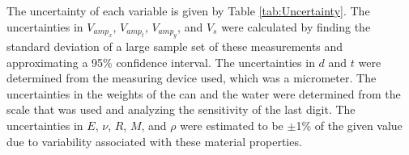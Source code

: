 \documentclass[10pt,journal,letterpaper]{IEEEtran}
\begin{document}
The uncertainty of each variable is given by Table \ref{tab:Uncertainty}.
The uncertainties in $V_{amp_{x}}$, $V_{amp_{t}}$, $V_{amp_{y}}$, and $V_{s}$ were calculated by finding the standard deviation of a large sample set of these measurements and approximating a 95\% confidence interval.
The uncertainties in $d$ and $t$ were determined from the measuring device used, which was a micrometer.
The uncertainties in the weights of the can and the water were determined from the scale that was used and analyzing the sensitivity of the last digit.
The uncertainties in $E$, $\nu$, $R$, $M$, and $\rho$ were estimated to be $\pm$1\% of the given value due to variability associated with these material properties.
\begin{table}[H]
\renewcommand\arraystretch{1.25}
\centering
\caption{Uncertainty in Each Variable}
\end{table}
\end{document}
